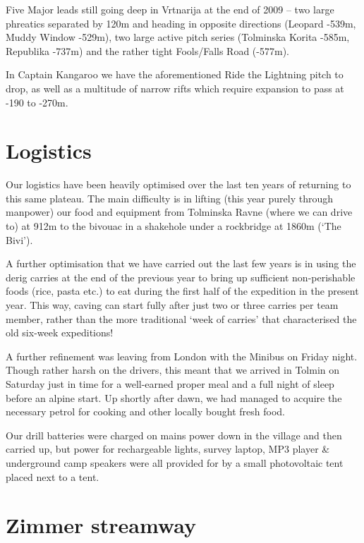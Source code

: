Five Major leads still going deep in Vrtnarija at the end of 2009 -- two
large phreatics separated by 120m and heading in opposite directions
(Leopard -539m, Muddy Window -529m), two large active pitch series
(Tolminska Korita -585m, Republika -737m) and the rather tight
Fools/Falls Road (-577m).

In Captain Kangaroo we have the aforementioned Ride the Lightning pitch
to drop, as well as a multitude of narrow rifts which require expansion
to pass at -190 to -270m.

\hypertarget{logistics}{%
\section{Logistics}\label{logistics}}

Our logistics have been heavily optimised over the last ten years of
returning to this same plateau. The main difficulty is in lifting (this
year purely through manpower) our food and equipment from Tolminska
Ravne (where we can drive to) at 912m to the bivouac in a shakehole
under a rockbridge at 1860m (`The Bivi').

A further optimisation that we have carried out the last few years is in
using the derig carries at the end of the previous year to bring up
sufficient non-perishable foods (rice, pasta etc.) to eat during the
first half of the expedition in the present year. This way, caving can
start fully after just two or three carries per team member, rather than
the more traditional `week of carries' that characterised the old
six-week expeditions!

A further refinement was leaving from London with the Minibus on Friday
night. Though rather harsh on the drivers, this meant that we arrived in
Tolmin on Saturday just in time for a well-earned proper meal and a full
night of sleep before an alpine start. Up shortly after dawn, we had
managed to acquire the necessary petrol for cooking and other locally
bought fresh food.

Our drill batteries were charged on mains power down in the village and
then carried up, but power for rechargeable lights, survey laptop, MP3
player \& underground camp speakers were all provided for by a small
photovoltaic tent placed next to a tent.

\hypertarget{zimmer-streamway}{%
\section{Zimmer streamway}\label{zimmer-streamway}}

